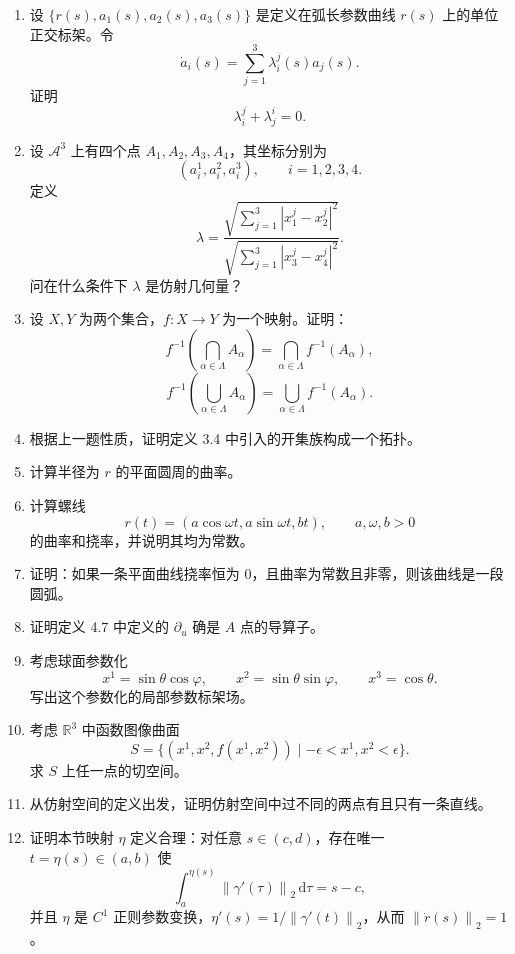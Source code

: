 \documentclass[UTF8,12pt,a4paper]{ctexart}
\newcommand{\A}{\mathcal A}
\newcommand{\R}{\mathbb R}
\newcommand{\dd}{\,\mathrm d}
\newcommand{\norm}[1]{\left\lVert #1\right\rVert}
\begin{document}
\begin{enumerate}
\item 设 $\{r(s),a_1(s),a_2(s),a_3(s)\}$ 是定义在弧长参数曲线 $r(s)$ 上的单位正交标架。令
\[
\dot a_i(s)=\sum_{j=1}^{3}\lambda_i^j(s)a_j(s).
\]
证明
\[
\lambda_i^j+\lambda_j^i=0.
\]

\item 设 $\A^3$ 上有四个点 $A_1,A_2,A_3,A_4$，其坐标分别为
\[
(a_i^1,a_i^2,a_i^3),\qquad i=1,2,3,4.
\]
定义
\[
\lambda=\frac{\sqrt{\sum_{j=1}^{3}|x_1^j-x_2^j|^2}}
{\sqrt{\sum_{j=1}^{3}|x_3^j-x_4^j|^2}}.
\]
问在什么条件下 $\lambda$ 是仿射几何量？

\item 设 $X,Y$ 为两个集合，$f:X\to Y$ 为一个映射。证明：
\[
f^{-1}\left(\bigcap_{\alpha\in\Lambda}A_\alpha\right)
=\bigcap_{\alpha\in\Lambda}f^{-1}(A_\alpha),
\]
\[
f^{-1}\left(\bigcup_{\alpha\in\Lambda}A_\alpha\right)
=\bigcup_{\alpha\in\Lambda}f^{-1}(A_\alpha).
\]

\item 根据上一题性质，证明定义 3.4 中引入的开集族构成一个拓扑。

\item 计算半径为 $r$ 的平面圆周的曲率。

\item 计算螺线
\[
r(t)=(a\cos\omega t,a\sin\omega t,bt),\qquad a,\omega,b>0
\]
的曲率和挠率，并说明其均为常数。

\item 证明：如果一条平面曲线挠率恒为 $0$，且曲率为常数且非零，则该曲线是一段圆弧。

\item 证明定义 4.7 中定义的 $\partial_u$ 确是 $A$ 点的导算子。

\item 考虑球面参数化
\[
x^1=\sin\theta\cos\varphi,\qquad
x^2=\sin\theta\sin\varphi,\qquad
x^3=\cos\theta.
\]
写出这个参数化的局部参数标架场。

\item 考虑 $\R^3$ 中函数图像曲面
\[
S=\{(x^1,x^2,f(x^1,x^2))\mid -\epsilon<x^1,x^2<\epsilon\}.
\]
求 $S$ 上任一点的切空间。

\item 从仿射空间的定义出发，证明仿射空间中过不同的两点有且只有一条直线。

\item 证明本节映射 $\eta$ 定义合理：对任意 $s\in(c,d)$，存在唯一 $t=\eta(s)\in(a,b)$ 使
\[
\int_a^{\eta(s)}\norm{\gamma'(\tau)}_2\dd\tau=s-c,
\]
并且 $\eta$ 是 $C^1$ 正则参数变换，$\eta'(s)=1/\norm{\gamma'(t)}_2$，从而 $\norm{\dot r(s)}_2=1$。


\end{enumerate}
\end{document}
